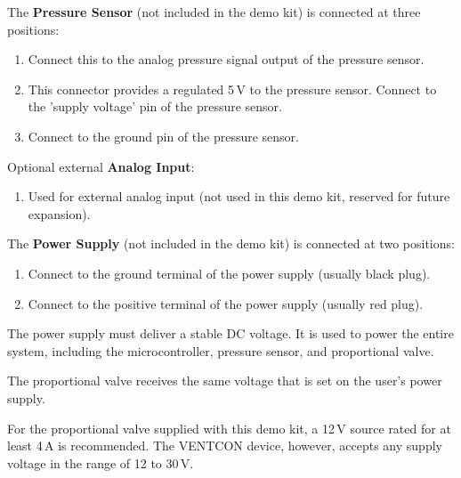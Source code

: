 \documentclass[
    11pt,
    a4paper,
    parskip=half-,          %
    headings=normal,        %
    captions=tableheading,  %
    numbers=noenddot        %
]{scrartcl}
\begin{document}
The \textbf{Pressure Sensor} (not included in the demo kit) is connected at three positions:
\begin{tcolorbox}[blanker, borderline west={1pt}{0pt}{ventrexblue}, left=1em]

    \begin{enumerate}[leftmargin=6em]
        \item [Pos. \textbf{1)}] Connect this to the analog pressure signal output of the pressure sensor.
        \item [Pos. \textbf{2)}] This connector provides a regulated 5\,V to the pressure sensor. Connect to the 'supply voltage' pin of the pressure sensor.
        \item [Pos. \textbf{3)}] Connect to the ground pin of the pressure sensor.
    \end{enumerate}
\end{tcolorbox}

\vspace{1ex}

Optional external \textbf{Analog Input}:
\begin{tcolorbox}[blanker, borderline west={1pt}{0pt}{ventrexblue}, left=1em]
    \begin{enumerate}[leftmargin=6em]
            \item [Pos. \textbf{4)}]  Used for external analog input (not used in this demo kit, reserved for future expansion).
    \end{enumerate}
\end{tcolorbox}


The \textbf{Power Supply} (not included in the demo kit) is connected at two positions:
\begin{tcolorbox}[blanker, borderline west={1pt}{0pt}{ventrexblue}, left=1em]

    \begin{enumerate}[leftmargin=6em]
             \item [Pos. \textbf{5)}] Connect to the ground terminal of the power supply (usually black plug).
            \item [Pos. \textbf{6)}] Connect to the positive terminal of the power supply (usually red plug).
    \end{enumerate}
    \vspace{1ex}
    The power supply must deliver a stable DC voltage. It is used to power the entire system, including the microcontroller, pressure sensor, and proportional valve.
    
    \begin{tcolorbox}[
		colback=ventrexblue!8,
		colframe=ventrexblue,
		fonttitle=\bfseries,
		title=Important,
		boxrule=0.6pt,
		arc=2pt
		]
 		The proportional valve receives the same voltage that is set on the user's power supply.
	\end{tcolorbox}

    For the proportional valve supplied with this demo kit, a 12\,V source rated for at least 4\,A is recommended. The VENTCON device, however, accepts any supply voltage in the range of 12 to 30\,V.
\end{tcolorbox}
\end{document}
